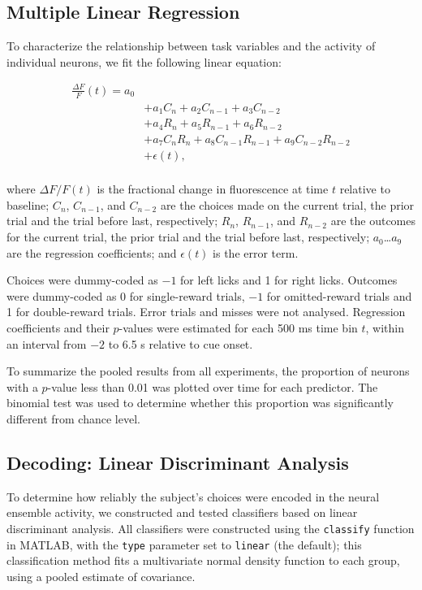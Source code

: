 \subsection*{Multiple Linear Regression}
To characterize the relationship between task variables and the activity of individual neurons, we fit the following linear equation:

\begin{equation*}
\begin{split}
\frac{\Delta F}{F}(t) = a_0 \\
&+ a_1 C_{n}        + a_2 C_{n-1}       + a_3 C_{n-2} \\
&+ a_4 R_{n}        + a_5 R_{n-1}       + a_6 R_{n-2} \\ 
&+ a_{7}C_{n}R_{n}  + a_8C_{n-1}R_{n-1} + a_9C_{n-2}R_{n-2} \\ 
&+ \epsilon(t),\\
\end{split} 
\end{equation*}

\noindent where $\Delta F/F(t)$ is the fractional change in fluorescence at time $t$ relative to baseline; $C_{n}$, $C_{n-1}$, and $C_{n-2}$ are the choices made on the current trial, the prior trial and the trial before last, respectively; $R_{n}$, $R_{n-1}$, and $R_{n-2}$ are the outcomes for the current trial, the prior trial and the trial before last, respectively; $a_0$…$a_9$ are the regression coefficients; and $\epsilon (t)$ is the error term. 

Choices were dummy-coded as $-1$ for left licks and 1 for right licks. Outcomes were dummy-coded as 0 for single-reward trials, $-1$ for omitted-reward trials and 1 for double-reward trials. Error trials and misses were not analysed. Regression coefficients and their $p$-values were estimated for each 500 ms time bin $t$, within an interval from $-2$ to 6.5 s relative to cue onset. 

To summarize the pooled results from all experiments, the proportion of neurons with a $p$-value less than 0.01 was plotted over time for each predictor. The binomial test was used to determine whether this proportion was significantly different from chance level.

\subsection*{Decoding: Linear Discriminant Analysis}
To determine how reliably the subject’s choices were encoded in the neural ensemble activity, we constructed and tested classifiers based on linear discriminant analysis. All classifiers were constructed using the \texttt{classify} function in MATLAB, with the \texttt{type} parameter set to \texttt{linear} (the default); this classification method fits a multivariate normal density function to each group, using a pooled estimate of covariance. 

